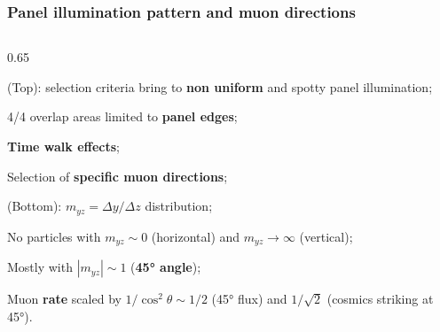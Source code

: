 \documentclass{beamer}
\begin{document}
\begin{frame}
    \frametitle{Panel illumination pattern and muon directions}
    \begin{columns}
\begin{column}{0.65\framewidth}
\vspace{-8mm}
   \setlength{\leftmargini}{1.2em}
      \begin{itemize}
 {\footnotesize
 
\item (Top): selection criteria bring to \textbf{non uniform} and spotty panel illumination;
 \vspace{3mm}
\item 4/4 overlap areas limited to \textbf{panel edges};
 \vspace{3mm}
\item \textbf{Time walk effects};
 \vspace{3mm}
\item Selection of \textbf{specific muon directions};
 \vspace{3mm}
\item (Bottom): $m_{yz}=\Delta y /\Delta z$ distribution;
 \vspace{3mm}
\item No particles with $m_{yz}\sim 0$ (horizontal) and $m_{yz} \rightarrow \infty$ (vertical);
 \vspace{3mm}
\item Mostly with $|m_{yz}| \sim 1$ (\textbf{45° angle});
 \vspace{3mm}
\item Muon \textbf{rate} scaled by $1/\cos^2\theta \sim 1/2$ (45° flux) and $1/\sqrt{2}$ (cosmics striking at 45°).}


\end{itemize}
\end{column}
\end{columns}
\end{frame}
\end{document}
